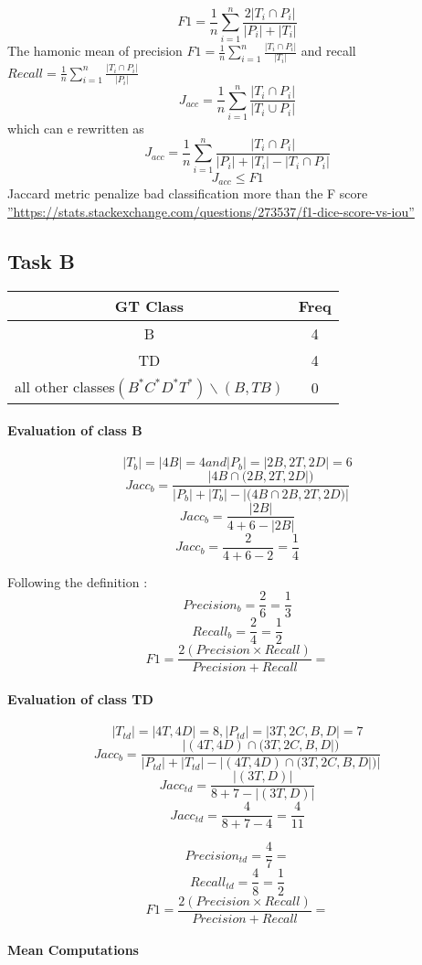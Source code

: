 \documentclass[10pt]{article}
\begin{document}
\paragraph{}
 $$F1 =\frac{1}{n}\sum_{i=1}^{n} \frac{2|{T_i}\cap{P_i}|}{|P_i|+|T_i|}$$
 The hamonic mean of precision $F1 =\frac{1}{n}\sum_{i=1}^{n} \frac{|{T_i}\cap{P_i}|}{|T_i|}$ and recall$Recall =\frac{1}{n}\sum_{i=1}^{n} \frac{|{T_i}\cap{P_i}|}{|P_i|}$
 $$J_{acc} =\frac{1}{n}\sum_{i=1}^{n} \frac{|{T_i}\cap{P_i}|}{|{T_i}\cup{P_i}|}$$
 which can e rewritten as
 $$J_{acc} =\frac{1}{n}\sum_{i=1}^{n} \frac{|{T_i}\cap{P_i}|}{|P_i|+|T_i|-|{T_i}\cap{P_i}|}$$
 $$J_{acc}\leq{F1}$$
Jaccard metric penalize bad classification more than the F score \hyperref[besteval]{''https://stats.stackexchange.com/questions/273537/f1-dice-score-vs-iou''}


\subsection{Task B}
\begin{center}
\begin{tabular}{ c c }
 GT Class & Freq  \\
 \hline
 B & 4  \\ 
 TD & 4   \\ 
 all other classes$(B^*C^*D^*T^*)\backslash (B,TB)$ & 0   
\end{tabular}
\end{center}
\paragraph{Evaluation of class B}
$$|T_b| = |4B| = 4 and |P_b| = |2B,2T,2D| = 6$$
$$Jacc_b = \frac{|4B\cap{(2B,2T,2D}|)}{|P_b|+|T_b|-|(4B\cap{2B,2T,2D)}|}$$
$$Jacc_b = \frac{|2B|}{4+6-|2B|}$$
$$Jacc_b = \frac{2}{4+6-2} = \frac{1}{4}$$

Following the definition :
$$Precision_b = \frac{2}{6} = \frac{1}{3}$$
$$Recall_b = \frac{2}{4} = \frac{1}{2}$$
$$F1 = \frac{2(Precision\times Recall)}{Precision + Recall} = $$

\paragraph{Evaluation of class TD}  
$$|T_{td}| = |4T,4D| = 8, |P_{td}| = |3T,2C,B,D| = 7$$
$$Jacc_b = \frac{|(4T,4D)\cap{(3T,2C,B,D}|)}{|P_{td}|+|T_{td}|-|(4T,4D)\cap{(3T,2C,B,D}|)|}$$
$$Jacc_{td} = \frac{|(3T,D)|}{8+7-|(3T,D)|}$$
$$Jacc_{td} = \frac{4}{8+7-4} = \frac{4}{11}$$

$$Precision_{td} = \frac{4}{7} = $$
$$Recall_{td} = \frac{4}{8} = \frac{1}{2}$$
$$F1 = \frac{2(Precision\times Recall)}{Precision + Recall} = $$

\paragraph{Mean Computations}
   
\end{document}
